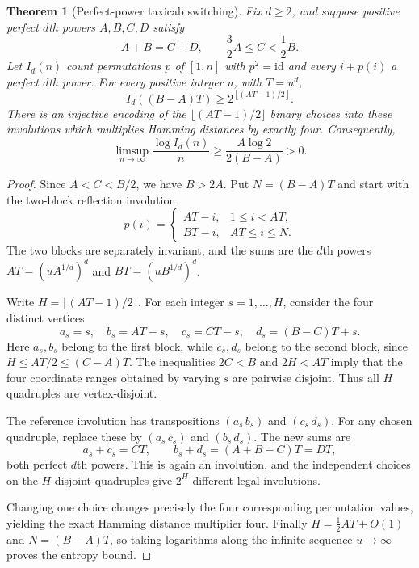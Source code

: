 \documentclass[10pt]{article}
\newtheorem{theorem}{Theorem}
\begin{document}
\begin{theorem}[Perfect-power taxicab switching]
\label{thm:taxicab-switching}
Fix $d\ge2$, and suppose positive perfect
$d$th powers $A,B,C,D$ satisfy
\[
\boxed{A+B=C+D,\qquad
\frac32A\le C<\frac12B.}
\]
Let $I_d(n)$ count permutations $p$
of $[1,n]$ with $p^2=\mathrm{id}$
and every $i+p(i)$ a perfect
$d$th power. For every positive integer
$u$, with $T=u^d$,
\begin{equation}\label{eq:taxicab-involutions}
\boxed{\displaystyle
I_d((B-A)T)\ge
2^{\left\lfloor(AT-1)/2\right\rfloor}.}
\end{equation}
There is an injective encoding of the
$\lfloor(AT-1)/2\rfloor$ binary choices
into these involutions which multiplies
Hamming distances by exactly four.
Consequently,
\[
\boxed{\displaystyle
\limsup_{n\to\infty}
\frac{\log I_d(n)}n
\ge\frac{A\log2}{2(B-A)}>0.}
\]
\end{theorem}
\begin{proof}
Since $A<C<B/2$, we have $B>2A$.
Put $N=(B-A)T$ and start with
the two-block reflection involution
\[
p(i)=
\begin{cases}
AT-i,&1\le i<AT,\\
BT-i,&AT\le i\le N.
\end{cases}
\]
The two blocks are separately invariant,
and the sums are the $d$th powers
$AT=(uA^{1/d})^d$ and
$BT=(uB^{1/d})^d$.

Write $H=\lfloor(AT-1)/2\rfloor$.
For each integer $s=1,\ldots,H$,
consider the four distinct vertices
\[
a_s=s,\quad b_s=AT-s,\quad
c_s=CT-s,\quad
d_s=(B-C)T+s.
\]
Here $a_s,b_s$ belong to the first
block, while $c_s,d_s$ belong
to the second block, since
$H\le AT/2\le(C-A)T$.
The inequalities $2C<B$ and
$2H<AT$ imply that the four
coordinate ranges obtained by varying
$s$ are pairwise disjoint.
Thus all $H$ quadruples are
vertex-disjoint.

The reference involution has
transpositions
$(a_s\,b_s)$ and $(c_s\,d_s)$.
For any chosen quadruple, replace
these by
$(a_s\,c_s)$ and $(b_s\,d_s)$.
The new sums are
\[
a_s+c_s=CT,\qquad
b_s+d_s=(A+B-C)T=DT,
\]
both perfect $d$th powers.
This is again an involution, and
the independent choices on the $H$
disjoint quadruples give $2^H$
different legal involutions.

Changing one choice changes precisely
the four corresponding permutation
values, yielding the exact Hamming
distance multiplier four.
Finally $H=\frac12AT+O(1)$ and
$N=(B-A)T$, so taking logarithms
along the infinite sequence $u\to\infty$
proves the entropy bound.
\end{proof}
\end{document}
